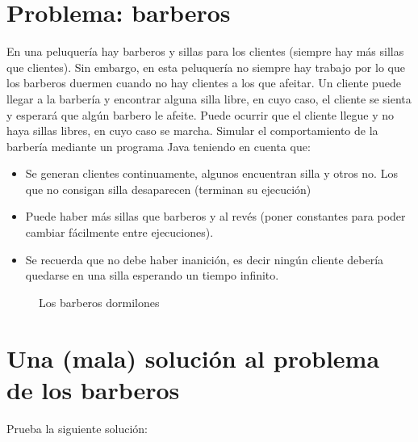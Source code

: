 \documentclass[letterpaper,10pt,spanish]{sphinxmanual}
\begin{document}
\section{Problema: barberos}
\label{\detokenize{textos/tema2:problema-barberos}}
En una peluquería hay barberos y sillas para los clientes (siempre hay más sillas que clientes). Sin embargo, en esta peluquería no siempre hay trabajo por lo que los barberos duermen cuando no hay clientes a los que afeitar. Un cliente puede llegar a la barbería y encontrar alguna silla libre, en cuyo caso, el cliente se sienta y esperará que algún barbero le afeite. Puede ocurrir que el cliente llegue y no haya sillas libres, en cuyo caso se marcha. Simular el comportamiento de la barbería mediante un programa Java teniendo en cuenta que:
\begin{itemize}
\item {} 
Se generan clientes continuamente, algunos encuentran silla y otros no. Los que no consigan silla desaparecen (terminan su ejecución)

\item {} 
Puede haber más sillas que barberos y al revés (poner constantes para poder cambiar fácilmente entre ejecuciones).

\item {} 
Se recuerda que no debe haber inanición, es decir ningún cliente debería quedarse en una silla esperando un tiempo infinito.

\end{itemize}

\begin{figure}[htbp]
\centering
\capstart

\noindent{}
\caption{Los  barberos dormilones}\label{\detokenize{textos/tema2:id6}}\end{figure}


\section{Una (mala) solución al problema de los barberos}
\label{\detokenize{textos/tema2:una-mala-solucion-al-problema-de-los-barberos}}
Prueba la siguiente solución:
\end{document}

